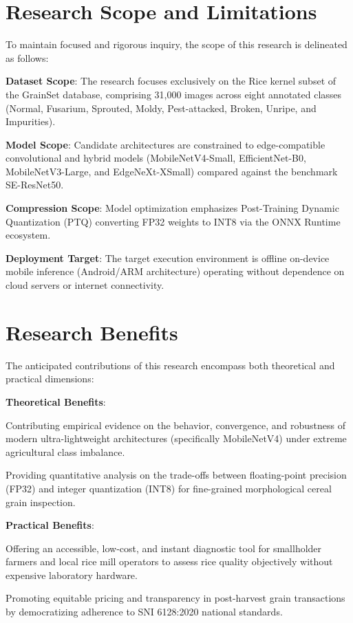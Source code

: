	\section{Research Scope and Limitations}
	To maintain focused and rigorous inquiry, the scope of this research is delineated as follows:
	\begin{secenumerate}
		\item \textbf{Dataset Scope}: The research focuses exclusively on the Rice kernel subset of the GrainSet database, comprising 31,000 images across eight annotated classes (Normal, Fusarium, Sprouted, Moldy, Pest-attacked, Broken, Unripe, and Impurities).
		\item \textbf{Model Scope}: Candidate architectures are constrained to edge-compatible convolutional and hybrid models (MobileNetV4-Small, EfficientNet-B0, MobileNetV3-Large, and EdgeNeXt-XSmall) compared against the benchmark SE-ResNet50.
		\item \textbf{Compression Scope}: Model optimization emphasizes Post-Training Dynamic Quantization (PTQ) converting FP32 weights to INT8 via the ONNX Runtime ecosystem.
		\item \textbf{Deployment Target}: The target execution environment is offline on-device mobile inference (Android/ARM architecture) operating without dependence on cloud servers or internet connectivity.
	\end{secenumerate}

	\section{Research Benefits}
	The anticipated contributions of this research encompass both theoretical and practical dimensions:
	\begin{secenumerate}
		\item \textbf{Theoretical Benefits}:
		\begin{secenumerate}
			\item Contributing empirical evidence on the behavior, convergence, and robustness of modern ultra-lightweight architectures (specifically MobileNetV4) under extreme agricultural class imbalance.
			\item Providing quantitative analysis on the trade-offs between floating-point precision (FP32) and integer quantization (INT8) for fine-grained morphological cereal grain inspection.
		\end{secenumerate}
		\item \textbf{Practical Benefits}:
		\begin{secenumerate}
			\item Offering an accessible, low-cost, and instant diagnostic tool for smallholder farmers and local rice mill operators to assess rice quality objectively without expensive laboratory hardware.
			\item Promoting equitable pricing and transparency in post-harvest grain transactions by democratizing adherence to SNI 6128:2020 national standards.
		\end{secenumerate}
	\end{secenumerate}
